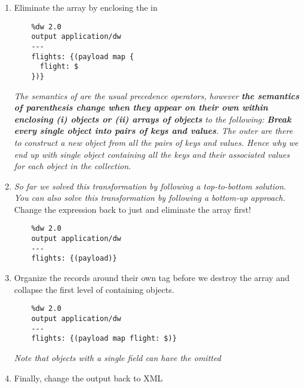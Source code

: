 \begin{enumerate}[resume*]
\item Eliminate the array by enclosing the  in \ttt{$\{()\}$}
  \begin{lstlisting}
    %dw 2.0
    output application/dw
    ---
    flights: {(payload map {
      flight: $
    })}
  \end{lstlisting}
  \emph{
    The semantics of \ttt{()} are the usual precedence operators, however \textbf{the semantics of parenthesis change when they appear on their own within \ttt{$\{\}$} enclosing (i) objects or (ii) arrays of objects} to the following: \textbf{Break every single object into pairs of keys and values}. The outer \ttt{$\{\}$} are there to construct a new object from all the pairs of keys and values. Hence why we end up with single object containing all the keys and their associated values for each object in the collection.
  }
\item \emph{So far we solved this transformation by following a top-to-bottom solution.  You can also solve this transformation by following a bottom-up approach.}
  \newline
  Change the expression back to just  and eliminate the array first!
  \begin{lstlisting}
    %dw 2.0
    output application/dw
    ---
    flights: {(payload)}
  \end{lstlisting}
\item Organize the records around their own tag before we destroy the array and collapse the first level of containing objects.
  \begin{lstlisting}
    %dw 2.0
    output application/dw
    ---
    flights: {(payload map flight: $)}
  \end{lstlisting}
  \emph{Note that objects with a single field can have the \ttt{$\{\}$} omitted}
\item Finally, change the output back to XML
  
\end{enumerate}

